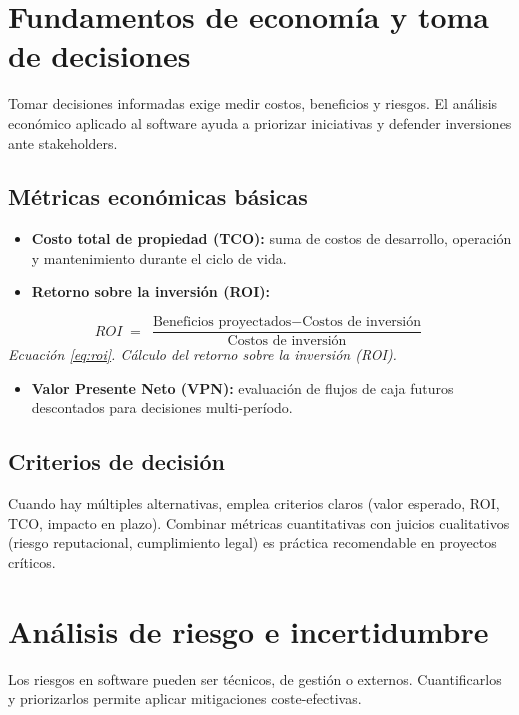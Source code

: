 \section{Fundamentos de economía y toma de decisiones}
Tomar decisiones informadas exige medir costos, beneficios y riesgos. El análisis económico aplicado al software ayuda a priorizar iniciativas y defender inversiones ante stakeholders.

\subsection*{Métricas económicas básicas}
\begin{itemize}
  \item \textbf{Costo total de propiedad (TCO):} suma de costos de desarrollo, operación y mantenimiento durante el ciclo de vida.
  \item \textbf{Retorno sobre la inversión (ROI):}
\end{itemize}

\begin{equation}\label{eq:roi}
ROI \;=\; \dfrac{\text{Beneficios proyectados} - \text{Costos de inversión}}{\text{Costos de inversión}}
\end{equation}
\noindent\textit{Ecuación \ref{eq:roi}. Cálculo del retorno sobre la inversión (ROI).}

\begin{itemize}
  \item \textbf{Valor Presente Neto (VPN):} evaluación de flujos de caja futuros descontados para decisiones multi-período.
\end{itemize}

\subsection*{Criterios de decisión}
Cuando hay múltiples alternativas, emplea criterios claros (valor esperado, ROI, TCO, impacto en plazo). Combinar métricas cuantitativas con juicios cualitativos (riesgo reputacional, cumplimiento legal) es práctica recomendable en proyectos críticos.

\section{Análisis de riesgo e incertidumbre}
Los riesgos en software pueden ser técnicos, de gestión o externos. Cuantificarlos y priorizarlos permite aplicar mitigaciones coste-efectivas.

